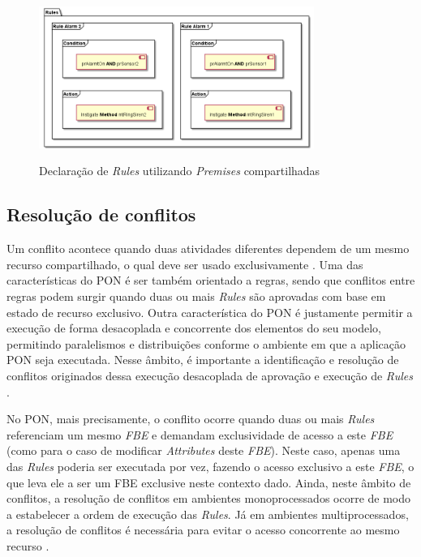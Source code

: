 \begin{figure}[!htb]
  \centering
  \caption{Declaração de \textit{Rules} utilizando \textit{Premises}
    compartilhadas}
  \includegraphics[width=0.8\textwidth]{../out/diagrams/rules_example/rules.png}
  \smallskip
  \label{fig:rules_shared_ex}
\end{figure}

\subsection{Resolução de conflitos}\label{sec:conflitos}

Um conflito acontece quando duas atividades diferentes dependem de um mesmo
recurso compartilhado, o qual deve ser usado exclusivamente
\cite{doc_simao_2005}. Uma das características do PON é ser também orientado a
regras, sendo que conflitos entre regras podem surgir quando duas ou mais
\textit{Rules} são aprovadas com base em estado de recurso exclusivo. Outra
característica do PON é justamente permitir a execução de forma desacoplada e
concorrente dos elementos do seu modelo, permitindo paralelismos e distribuições
conforme o ambiente em que a aplicação PON seja executada. Nesse âmbito, é
importante a identificação e resolução de conflitos originados dessa execução
desacoplada de aprovação e execução de \textit{Rules} \cite{msc_pordeus_2017}.

No PON, mais precisamente, o conflito ocorre quando duas ou mais \textit{Rules}
referenciam um mesmo \textit{FBE} e demandam exclusividade de acesso a este
\textit{FBE} (como para o caso de modificar \textit{Attributes} deste
\textit{FBE}). Neste caso, apenas uma das \textit{Rules} poderia ser executada
por vez, fazendo o acesso exclusivo a este \textit{FBE}, o que leva ele a ser um
FBE exclusive neste contexto dado. Ainda, neste âmbito de conflitos, a resolução
de conflitos em ambientes monoprocessados ocorre de modo a estabelecer a ordem
de execução das \textit{Rules}. Já em ambientes multiprocessados, a resolução de
conflitos é necessária para evitar o acesso concorrente ao mesmo recurso
\cite{msc_valenca_2012,msc_Banaszewski_2009}.

